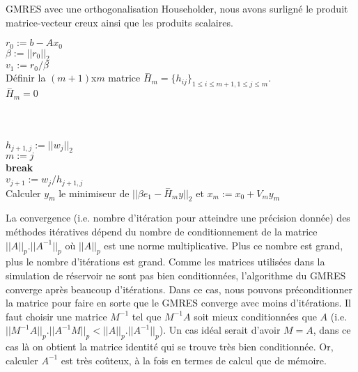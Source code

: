 \begin{algorithm}
  \caption{GMRES avec une orthogonalisation Householder, nous avons surligné le produit matrice-vecteur creux ainsi que les produits scalaires.}
  \label{algo:gmres}
  $r_0 := b - Ax_0$ \\
  $\beta := ||r_0||_2$ \\
  $v_1 := r_0/\beta$ \\
  Définir la $(m + 1)$x$m$ matrice $\overset{-}{H}_m = \{h_{ij}\}_{1 \leq i \leq m+1, 1 \leq j \leq m}$.  \\
  $\overset{-}{H}_m = 0$ \\
   {
    \\
     {
       \\
       \\
    }
    $h_{j+1,j} := ||w_j||_2$ \\
     {
      $m := j$ \\
      \textbf{break} \\
    }
    $v_{j+1} := w_j/h_{j+1,j}$ \\
  }
  Calculer $y_m$ le minimiseur de $||\beta{}e_1 - \overset{-}{H}_my||_2$ et $x_m := x_0 + V_my_m$
\end{algorithm}

La convergence (i.e. nombre d'itération pour atteindre une précision donnée) des méthodes itératives dépend du nombre de conditionnement de la matrice $||A||_p.||A^{-1}||_p$ où $||A||_p$ est une norme multiplicative.
%
Plus ce nombre est grand, plus le nombre d'itérations est grand.
%
Comme les matrices utilisées dans la simulation de réservoir ne sont pas bien conditionnées, l'algorithme du GMRES converge après beaucoup d'itérations.
%
Dans ce cas, nous pouvons préconditionner la matrice pour faire en sorte que le GMRES converge avec moins d'itérations.
%
Il faut choisir une matrice $M^{-1}$ tel que $M^{-1}A$ soit mieux conditionnées que $A$ (i.e. $||M^{-1}A||_p.||A^{-1}M||_p < ||A||_p.||A^{-1}||_p$).
%
Un cas idéal serait d'avoir $M=A$, dans ce cas là on obtient la matrice identité qui se trouve très bien conditionnée.
%
Or, calculer $A^{-1}$ est très coûteux, à la fois en termes de calcul que de mémoire.



